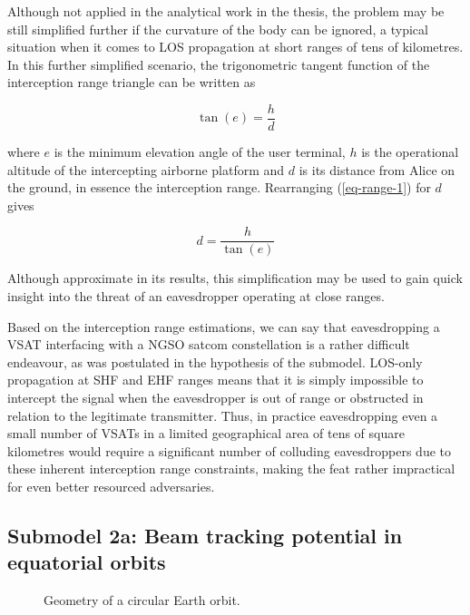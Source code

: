 \documentclass[english, 12pt, a4paper, elec, utf8, a-1b, online]{aaltothesis}
\begin{document}
Although not applied in the analytical work in the thesis, the problem may be still simplified further if the curvature of the body can be ignored, a typical situation when it comes to LOS propagation at short ranges of tens of kilometres.
In this further simplified scenario, the trigonometric tangent function of the interception range triangle can be written as

\begin{equation} \label{eq-range-1}
  \tan(e) = \frac{h}{d}
\end{equation}

\noindent
where $e$ is the minimum elevation angle of the user terminal, $h$ is the operational altitude of the intercepting airborne platform and $d$ is its distance from Alice on the ground, in essence the interception range.
Rearranging (\ref{eq-range-1}) for $d$ gives

\begin{equation} \label{eq-range-2}
  d = \frac{h}{\tan(e)}
\end{equation}

Although approximate in its results, this simplification may be used to gain quick insight into the threat of an eavesdropper operating at close ranges.

Based on the interception range estimations, we can say that eavesdropping a VSAT interfacing with a NGSO satcom constellation is a rather difficult endeavour, as was postulated in the hypothesis of the submodel.
LOS-only propagation at SHF and EHF ranges means that it is simply impossible to intercept the signal when the eavesdropper is out of range or obstructed in relation to the legitimate transmitter.
Thus, in practice eavesdropping even a small number of VSATs in a limited geographical area of tens of square kilometres would require a significant number of colluding eavesdroppers due to these inherent interception range constraints, making the feat rather impractical for even better resourced adversaries.

\subsection{Submodel 2a: Beam tracking potential in equatorial orbits} \label{ch-results-submodel-2a-tracking-equatorial}

\begin{figure}[h]
  \centering
  
  \caption{Geometry of a circular Earth orbit.}
  \label{fig-orbit-geometry}
\end{figure}
\end{document}
